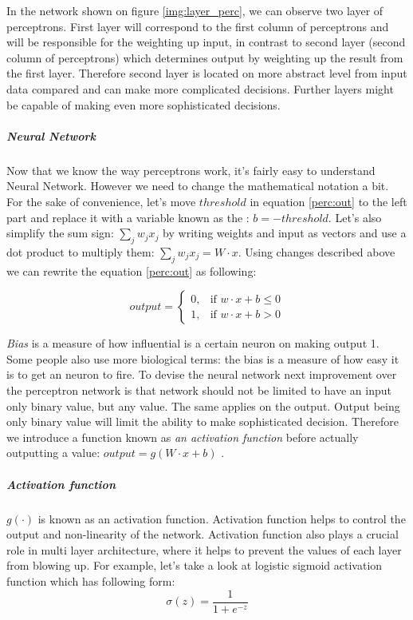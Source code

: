 In the network shown on figure \ref{img:layer_perc}, we can observe
two layer of perceptrons. First layer will correspond to the first column of perceptrons
and will be responsible for the weighting up input, in contrast to second layer
(second column of perceptrons) which determines output by weighting up the result from
the first layer. Therefore second layer is located on more abstract level from input data
compared and can make more complicated decisions. Further layers might be capable
of making even more sophisticated decisions.

\subparagraph{Neural Network} Now that we know the way perceptrons work,
it's fairly easy to understand Neural Network. However we need to change
the mathematical notation a bit. For the sake of convenience, let's move
$threshold$ in equation \ref{perc:out} to the left part and replace it
with a variable known as the  : $ b = -threshold$. Let's also simplify
the sum sign: $\sum_j w_j x_j$ by writing weights and input as vectors and use a dot product
to multiply them:
$\sum_j w_j x_j = W \cdot x$. Using changes described above we can rewrite the
equation \ref{perc:out} as following:

\begin{equation} \label{perc:with_bias}
	output = \begin{cases} 0, & \mbox{if } w \cdot x + b\leq 0 \\ 1, & \mbox{if } w \cdot x + b > 0 \end{cases}
\end{equation}

\emph{Bias} is a measure of how influential is a certain neuron on making output 1.
Some people also use more biological terms: the bias is a measure of how easy it is
to get an neuron to fire. To devise the neural network
next improvement over the perceptron network is that network should not be limited
to have an input only binary value, but any value. The same applies on the output.
Output being only binary value will limit the ability to make sophisticated decision.
Therefore we introduce a function known as \emph{an activation function} before
actually outputting a value: $output = g( W \cdot x + b)$ \cite{Nielsen2015} .

\subparagraph{Activation function} $g(\cdot)$ is known as an activation function.
Activation function helps to control the output and non-linearity of the network.
Activation function also plays a crucial role in multi layer architecture, where it helps
to prevent the values of each layer from blowing up.
For example, let's take a look at logistic sigmoid activation function which has
following form:
\begin{equation} \label{sigmoid_function}
	\sigma(z) = \frac{1}{1 + e^{-z}}
\end{equation}

